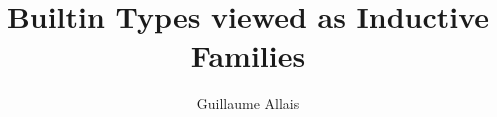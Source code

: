 \documentclass{article}
\begin{document}
\title{Builtin Types viewed as Inductive Families
}
\author{Guillaume Allais}

\maketitle

\togglefalse{BLIND}

\begin{abstract}
  
\end{abstract}












\appendix



\end{document}
